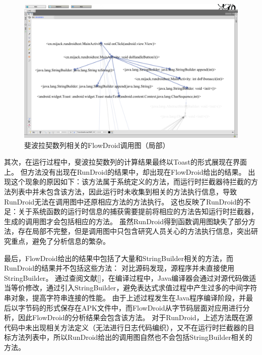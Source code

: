 \begin{figure}[!hb]
	\centering
	\includegraphics[width=\textwidth]{./Figures/FlowDroid-Fibonacci.png}
	\caption{斐波拉契数列相关的FlowDroid调用图（局部）}
	\label{fig:flowdroid-result-Fibonacci}
\end{figure}


其次，在运行过程中，斐波拉契数列的计算结果最终以Toast的形式展现在界面上。
但方法没有出现在RunDroid的结果中，却出现在FlowDroid给出的结果。
出现这个现象的原因如下：该方法属于系统定义的方法，而运行时拦截器待拦截的方法列表中并未包含该方法，因此运行时未收集到相关的方法执行信息，导致RunDroid无法在调用图中还原相应方法的方法执行。
这也反映了RunDroid的不足：关于系统函数的运行时信息的捕获需要提前将相应的方法告知运行时拦截器，生成的调用图才会包括相应的方法。
虽然RunDroid得到函数调用图缺失了部分方法，存在局部不完整，但是调用图中只包含研究人员关心的方法执行信息，突出研究重点，避免了分析信息的繁杂。



最后，FlowDroid给出的结果中包括了大量和{StringBuilder}相关的方法，而RunDroid的结果并不包括这些方法：
对比源码发现，源程序并未直接使用 {StringBuilder}。
通过查阅文献[]，在编译过程中，Java编译器会通过对源代码做适当等价修改，通过引入{StringBuilder}，避免表达式求值过程中产生过多的中间字符串对象，提高字符串连接的性能。
由于上述过程发生在Java程序编译阶段，并最后以字节码的形式保存在APK文件中，而FlowDroid从字节码层面对应用进行分析，因此FlowDroid的分析结果会包含该方法。
对于RunDroid，上述方法既在源代码中未出现相关方法定义（无法进行日志代码编织），又不在运行时拦截器的目标方法列表中，所以RunDroid给出的调用图自然也不会包括{StringBuilder}相关的方法。



